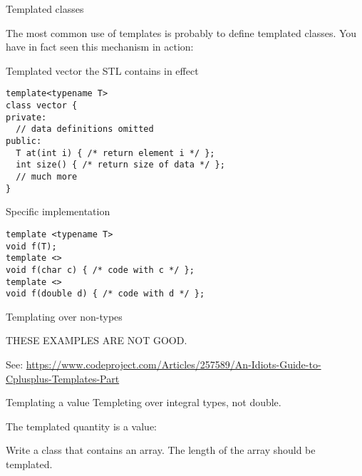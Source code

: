  {Templated classes}

The most common use of templates is probably to define templated
classes.
You have in fact seen this mechanism in action:
\begin{block}{Templated vector}
  \label{sl:template-vector}
  the \ac{STL} contains
  in effect
\begin{lstlisting}
template<typename T>
class vector {
private:
  // data definitions omitted
public:
  T at(int i) { /* return element i */ };
  int size() { /* return size of data */ };
  // much more
}
\end{lstlisting}
\end{block}

 {Specific implementation}

\begin{lstlisting}
template <typename T>
void f(T);
template <> 
void f(char c) { /* code with c */ };
template <>
void f(double d) { /* code with d */ };
\end{lstlisting}

 {Templating over non-types}

THESE EXAMPLES ARE NOT GOOD.

See:
\url{https://www.codeproject.com/Articles/257589/An-Idiots-Guide-to-Cplusplus-Templates-Part}

\begin{block}{Templating a value}
  Templeting over integral types, not double.

  The templated quantity is a value:
\end{block}

\begin{exercise}
  Write a class that contains an array. The length of the array should
  be templated.
\end{exercise}
